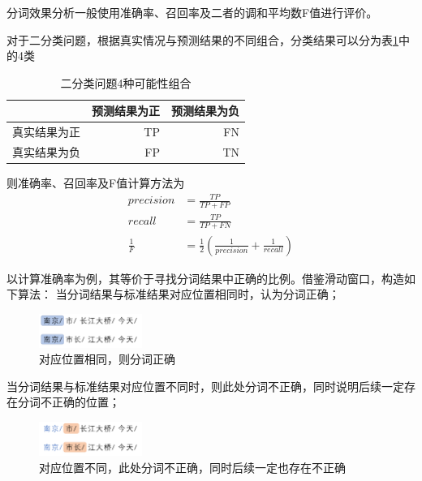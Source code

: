 分词效果分析一般使用准确率、召回率及二者的调和平均数F值进行评价。

对于二分类问题，根据真实情况与预测结果的不同组合，分类结果可以分为表\ref{TPFPFNTN}中的4类
\begin{table}[H]
  \centering
  \begin{tabular}{rrr}
    \hline
    \textbf{}    & \textbf{预测结果为正} & \textbf{预测结果为负} \\
    \hline
    真实结果为正 & TP                    & FN                    \\
    真实结果为负 & FP                    & TN                    \\
    \hline
  \end{tabular}
  \caption{二分类问题4种可能性组合}
  \label{TPFPFNTN}
\end{table}

则准确率、召回率及F值计算方法为
\begin{align}
  precision   & = \frac{TP}{TP + FP}                                            \\
  recall      & = \frac{TP}{TP + FN}                                            \\
  \frac{1}{F} & = \frac{1}{2} \left(\frac{1}{precision}+\frac{1}{recall}\right)
\end{align}

以计算准确率为例，其等价于寻找分词结果中正确的比例。借鉴滑动窗口，构造如下算法：
当分词结果与标准结果对应位置相同时，认为分词正确；

\begin{figure}[H]
  \centering
  \includegraphics[width=0.3\textwidth]{figures/figure_02.png}
  \caption{对应位置相同，则分词正确}
\end{figure}

当分词结果与标准结果对应位置不同时，则此处分词不正确，同时说明后续一定存在分词不正确的位置；

\begin{figure}[H]
  \centering
  \includegraphics[width=0.3\textwidth]{figures/figure_03.png}
  \caption{对应位置不同，此处分词不正确，同时后续一定也存在不正确}
\end{figure}

